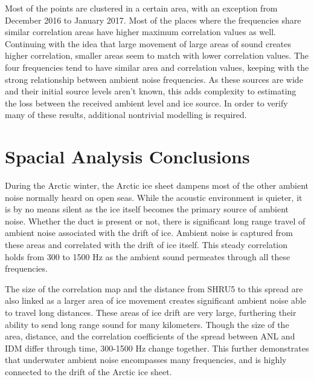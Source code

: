 Most of the points are clustered in a certain area, with an exception from December 2016 to January 2017. Most of the places where the frequencies share similar correlation areas have higher maximum correlation values as well. Continuing with the idea that large movement of large areas of sound creates higher correlation, smaller areas seem to match with lower correlation values. The four frequencies tend to have similar area and correlation values, keeping with the strong relationship between ambient noise frequencies. As these sources are wide and their initial source levels aren't known, this adds complexity to estimating the loss between the received ambient level and ice source. In order to verify many of these results, additional nontrivial modelling is required. 







\section{Spacial Analysis Conclusions} %

%
During the Arctic winter, the Arctic ice sheet dampens most of the other ambient noise normally heard on open seas. While the acoustic environment is quieter, it is by no means silent as the ice itself becomes the primary source of ambient noise.  Whether the duct is present or not, there is significant long range travel of ambient noise associated with the drift of ice. Ambient noise is captured from these areas and correlated with the drift of ice itself. This steady correlation holds from 300 to 1500 Hz as the ambient sound permeates through all these frequencies.

The size of the correlation map and the distance from SHRU5 to this spread are also linked as a larger area of ice movement creates significant ambient noise able to travel long distances. These areas of ice drift are very large, furthering their ability to send long range sound for many kilometers. Though the size of the area, distance, and the correlation coefficients of the spread between ANL and IDM differ through time, 300-1500 Hz change together. This further demonstrates that underwater ambient noise encompasses many frequencies, and is highly connected to the drift of the Arctic ice sheet. 







